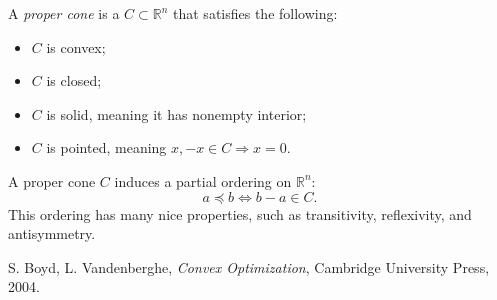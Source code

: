 \documentclass[12pt]{article}
\begin{document}
A \emph{proper cone} is a  $C\subset\mathbb{R}^n$ that satisfies the following:
\begin{itemize}
\item $C$ is convex;
\item $C$ is closed;
\item $C$ is solid, meaning it has nonempty interior;
\item $C$ is pointed, meaning $x, -x\in C\Rightarrow x=0$.
\end{itemize}
\bigskip

A proper cone $C$ induces a partial ordering on $\mathbb{R}^n$:
\begin{displaymath}
a\preceq b\Leftrightarrow b-a\in C.
\end{displaymath}
This ordering has many nice properties, such as transitivity, reflexivity, and antisymmetry.
\par\bigskip

\begin{thebibliography}{4}
 S. Boyd, L. Vandenberghe, \emph{Convex Optimization}, Cambridge University Press, 2004.
\end{thebibliography}
\end{document}
